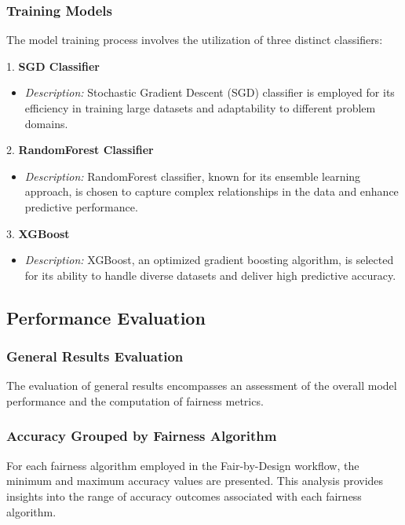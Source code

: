 \subsubsection{Training Models}

The model training process involves the utilization of three distinct classifiers:

1. \textbf{SGD Classifier}
   \begin{itemize}
       \item \textit{Description:} Stochastic Gradient Descent (SGD) classifier is employed for its efficiency in training large datasets and adaptability to different problem domains.
   \end{itemize}

2. \textbf{RandomForest Classifier}
   \begin{itemize}
       \item \textit{Description:} RandomForest classifier, known for its ensemble learning approach, is chosen to capture complex relationships in the data and enhance predictive performance.
   \end{itemize}

3. \textbf{XGBoost}
   \begin{itemize}
       \item \textit{Description:} XGBoost, an optimized gradient boosting algorithm, is selected for its ability to handle diverse datasets and deliver high predictive accuracy.
   \end{itemize}

\subsection{Performance Evaluation}

\subsubsection{General Results Evaluation}

The evaluation of general results encompasses an assessment of the overall model performance and the computation of fairness metrics.

\subsubsection{Accuracy Grouped by Fairness Algorithm}

For each fairness algorithm employed in the Fair-by-Design workflow, the minimum and maximum accuracy values are presented. This analysis provides insights into the range of accuracy outcomes associated with each fairness algorithm.

